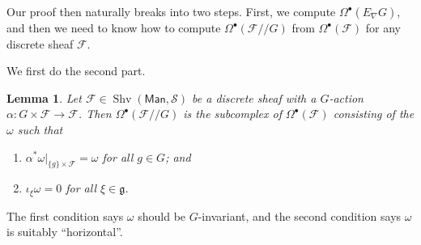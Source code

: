 \documentclass{shortart}
\newtheorem{lemma}[thm]{Lemma}
\theoremstyle{definition}
\DeclareMathOperator\Shv{Shv}
\newcommand\Man{\mathsf{Man}}
\newcommand\modmod{/\!/}
\renewcommand\S{\mathcal{S}}
\begin{document}
Our proof then naturally breaks into two steps. First, we compute $\Omega^\bullet(E_\nabla G)$, and then we need to know how to compute $\Omega^\bullet(\mathcal{F}\modmod G)$ from $\Omega^\bullet (\mathcal{F})$ for any discrete sheaf $\mathcal{F}$.

We first do the second part.

\begin{lemma}\label{lemma:omega-mod-g}
  Let $\mathcal{F} \in \Shv(\Man, \S)$ be a discrete sheaf with a $G$-action $\alpha: G \times \mathcal{F} \to \mathcal{F}$. Then $\Omega^\bullet(\mathcal{F} \modmod G)$ is the subcomplex of $\Omega^\bullet(\mathcal{F})$ consisting of the $\omega$ such that
  \begin{enumerate}
    \item[(1)] $\alpha^* \omega|_{\{g\} \times \mathcal{F}} = \omega$ for all $g \in G$; and
    \item[(2)] $\iota_\xi \omega = 0$ for all $\xi \in \mathfrak{g}$.
  \end{enumerate}
\end{lemma}
The first condition says $\omega$ should be $G$-invariant, and the second condition says $\omega$ is suitably ``horizontal''.
\end{document}
